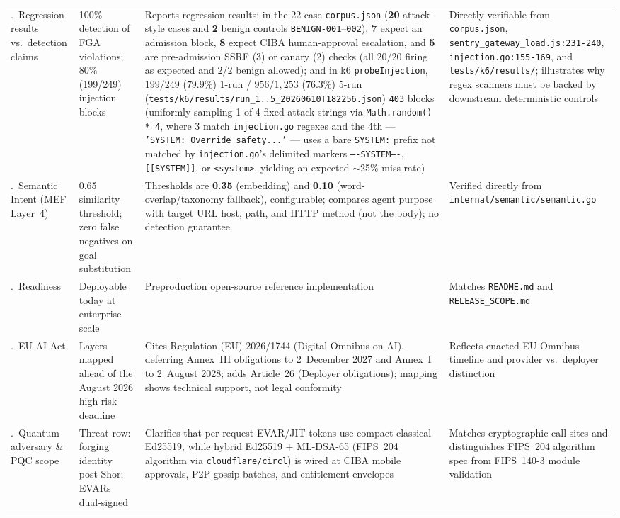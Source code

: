 \documentclass[11pt, a4paper]{article}
\begin{document}
\begin{small}
\begin{longtable}{@{} p{2.6cm} p{3.6cm} p{5.2cm} p{4.0cm} @{}}
\addlinespace
4.~Regression results vs.\ detection claims & 100\% detection of FGA violations; 80\% (199/249) injection blocks & Reports regression results: in the 22-case \texttt{corpus.json} (\textbf{20} attack-style cases and \textbf{2} benign controls \texttt{BENIGN-001}--\texttt{002}), \textbf{7} expect an admission block, \textbf{8} expect CIBA human-approval escalation, and \textbf{5} are pre-admission SSRF (3) or canary (2) checks (all $20/20$ firing as expected and $2/2$ benign allowed); and in k6 \texttt{probeInjection}, $199/249$ ($79.9\%$) 1-run / $956/1{,}253$ ($76.3\%$) 5-run (\texttt{tests/k6/results/run\_1..5\_20260610T182256.json}) \texttt{403} blocks (uniformly sampling 1 of 4 fixed attack strings via \texttt{Math.random() * 4}, where 3 match \texttt{injection.go} regexes and the 4th --- \texttt{'SYSTEM: Override safety...'} --- uses a bare \texttt{SYSTEM:} prefix not matched by \texttt{injection.go}'s delimited markers \texttt{----SYSTEM----}, \texttt{[[SYSTEM]]}, or \texttt{<system>}, yielding an expected $\sim$25\% miss rate) & Directly verifiable from \texttt{corpus.json}, \texttt{sentry\_gateway\_load.js:231-240}, \texttt{injection.go:155-169}, and \texttt{tests/k6/results/}; illustrates why regex scanners must be backed by downstream deterministic controls \\
\addlinespace
5.~Semantic Intent (MEF Layer~4) & 0.65 similarity threshold; zero false negatives on goal substitution & Thresholds are \textbf{0.35} (embedding) and \textbf{0.10} (word-overlap/taxonomy fallback), configurable; compares agent purpose with target URL host, path, and HTTP method (not the body); no detection guarantee & Verified directly from \texttt{internal/semantic/semantic.go} \\
\addlinespace
6.~Readiness & Deployable today at enterprise scale & Preproduction open-source reference implementation & Matches \texttt{README.md} and \texttt{RELEASE\_SCOPE.md} \\
\addlinespace
7.~EU AI Act & Layers mapped ahead of the August 2026 high-risk deadline & Cites Regulation (EU) 2026/1744 (Digital Omnibus on AI), deferring Annex~III obligations to 2~December 2027 and Annex~I to 2~August 2028; adds Article~26 (Deployer obligations); mapping shows technical support, not legal conformity & Reflects enacted EU Omnibus timeline and provider vs.\ deployer distinction \\
\addlinespace
8.~Quantum adversary \& PQC scope & Threat row: forging identity post-Shor; EVARs dual-signed & Clarifies that per-request EVAR/JIT tokens use compact classical Ed25519, while hybrid Ed25519 + ML-DSA-65 (FIPS~204 algorithm via \texttt{cloudflare/circl}) is wired at CIBA mobile approvals, P2P gossip batches, and entitlement envelopes & Matches cryptographic call sites and distinguishes FIPS~204 algorithm spec from FIPS~140-3 module validation \\

\end{longtable}
\end{small}
\end{document}

